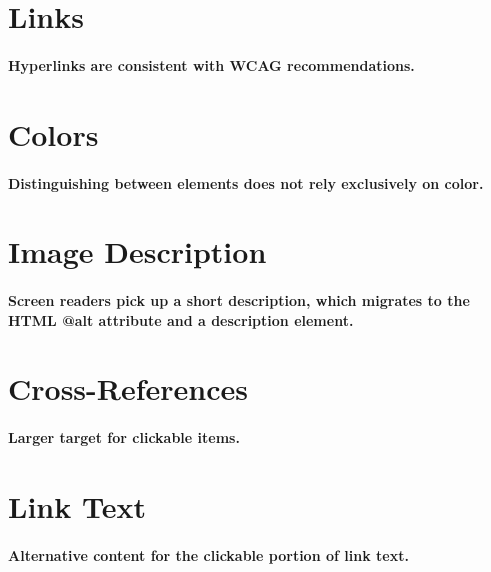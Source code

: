 \documentclass{article}
\begin{document}
\section{Links}
\paragraph{
Hyperlinks are consistent with WCAG recommendations.
}

\section{Colors}
\paragraph{
Distinguishing between elements does not rely exclusively on color.
}

\section{Image Description}
\paragraph{
Screen readers pick up a short description, which migrates to the HTML @alt attribute and a description element.
}

\section{Cross-References}
\paragraph{
Larger target for clickable items.
}

\section{Link Text}
\paragraph{
Alternative content for the clickable portion of link text.
}
\end{document}
